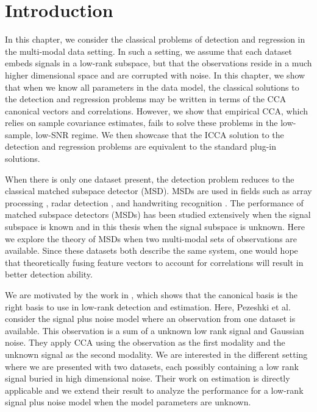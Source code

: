 \section{Introduction}

In this chapter, we consider the classical problems of detection and regression in the
multi-modal data setting. In such a setting, we assume that each dataset embeds signals in
a low-rank subspace, but that the observations reside in a much higher dimensional space
and are corrupted with noise. In this chapter, we show that when we know all parameters in
the data model, the classical solutions to the detection and regression problems may be
written in terms of the CCA canonical vectors and correlations. However, we show that
empirical CCA, which relies on sample covariance estimates, fails to solve these problems
in the low-sample, low-SNR regime. We then showcase that the ICCA solution to the
detection and regression problems are equivalent to the standard plug-in solutions.

When there is only one dataset present, the detection problem reduces to the classical
matched subspace detector (MSD). MSDs are used in fields such as array processing
\cite{besson2006cfar, besson2005matched}, radar detection \cite{bandiera2007glrt,
  bandiera2007adaptive}, and handwriting recognition \cite{elden2007matrix}. The
performance of matched subspace detectors (MSDs) has been studied extensively when the
signal subspace is known \cite{mcwhorter2003matched, vincent2008matched,
  scharf1994matched, jin2005cfar} and in this thesis when the signal subspace is
unknown. Here we explore the theory of MSDs when two multi-modal sets of observations are
available. Since these datasets both describe the same system, one would hope that
theoretically fusing feature vectors to account for correlations will result in better
detection ability. 

We are motivated by the work in \cite{pezeshki2006canonical}, which shows that the
canonical basis is the right basis to use in low-rank detection and estimation. Here,
Pezeshki et al. consider the signal plus noise model where an observation from one
dataset is available. This observation is a sum of a unknown low rank signal and Gaussian
noise. They apply CCA using the observation as the first modality and the unknown signal
as the second modality. We are interested in the different setting where we are presented
with two datasets, each possibly containing a low rank signal buried in high dimensional
noise. Their work on estimation is directly applicable and we extend their result to
analyze the performance for a low-rank signal plus noise model when the model parameters
are unknown. 

